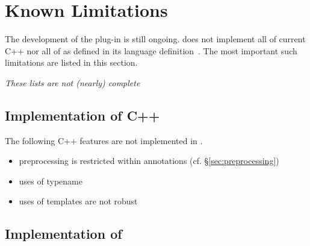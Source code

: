 \chapter{Known Limitations}

The development of the \fclang plug-in is still ongoing.
\fclang does not implement all of current C++ nor all of 
\acslpp as defined in its language definition~\cite{acslpp}.
The most important such limitations are listed in this section.

\textit{These lists are not (nearly) complete}

\section{Implementation of C++}

The following C++ features are not implemented in \acslpp.
\begin{itemize}
\item preprocessing is restricted within \acslpp annotations (cf. \S\ref{sec:preprocessing})
\item uses of typename
\item uses of templates are not robust
\end{itemize}

\section{Implementation of \acslpp}

